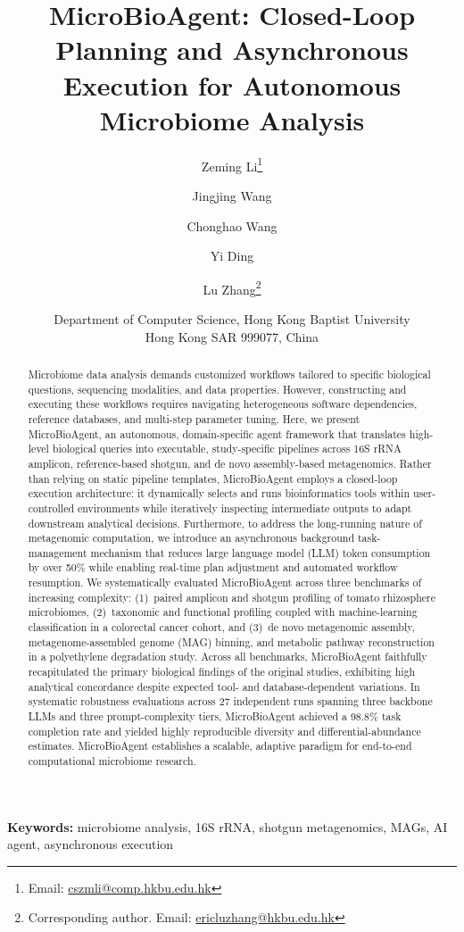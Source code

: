 \documentclass[10pt,letterpaper]{article}
\title{MicroBioAgent: Closed-Loop Planning and Asynchronous Execution for
Autonomous Microbiome Analysis}
\author{Zeming Li\thanks{Email: \url{cszmli@comp.hkbu.edu.hk}} \and Jingjing
Wang \and Chonghao Wang \and Yi Ding \and Lu Zhang\thanks{Corresponding author.
Email: \url{ericluzhang@hkbu.edu.hk}}}
\date{Department of Computer Science, Hong Kong Baptist University\\Hong Kong
SAR 999077, China}
\begin{document}
\begin{titlepage}
\maketitle
\begin{abstract}
    Microbiome data analysis demands customized workflows tailored to specific
    biological questions, sequencing modalities, and data properties.  However,
    constructing and executing these workflows requires navigating heterogeneous
    software dependencies, reference databases, and multi-step parameter tuning.
    Here, we present MicroBioAgent, an autonomous, domain-specific agent
    framework
    that translates high-level biological queries into executable,
    study-specific
    pipelines across 16S rRNA amplicon, reference-based shotgun, and de novo
    assembly-based metagenomics.  Rather than relying on static pipeline
    templates,
    MicroBioAgent employs a closed-loop execution architecture: it dynamically
    selects and runs bioinformatics tools within user-controlled environments
    while
    iteratively inspecting intermediate outputs to adapt downstream analytical
    decisions.  Furthermore, to address the long-running nature of metagenomic
    computation, we introduce an asynchronous background task-management
    mechanism
    that reduces large language model (LLM) token consumption by over 50\%
    while enabling real-time plan
    adjustment and automated workflow resumption.  We systematically evaluated
    MicroBioAgent across three benchmarks of increasing complexity: (1)~paired
    amplicon and shotgun profiling of tomato rhizosphere microbiomes,
    (2)~taxonomic
    and functional profiling coupled with machine-learning classification in a
    colorectal cancer cohort, and (3)~de novo metagenomic assembly,
    metagenome-assembled genome (MAG) binning, and metabolic pathway
    reconstruction
    in a polyethylene degradation study.  Across all benchmarks, MicroBioAgent
    faithfully recapitulated the primary biological findings of the original
    studies, exhibiting high analytical concordance despite expected tool- and
    database-dependent variations.  In systematic robustness evaluations across
    27
    independent runs spanning three backbone LLMs and three
    prompt-complexity tiers, MicroBioAgent achieved a 98.8\% task completion
    rate
    and yielded highly reproducible diversity and differential-abundance
    estimates.
    MicroBioAgent establishes a scalable, adaptive paradigm for end-to-end
    computational microbiome research.
\end{abstract}
\vfill
\noindent\textbf{Keywords:} microbiome analysis, 16S rRNA, shotgun
metagenomics, MAGs, AI agent, asynchronous execution
\end{titlepage}
\setcounter{page}{1}
\end{document}
